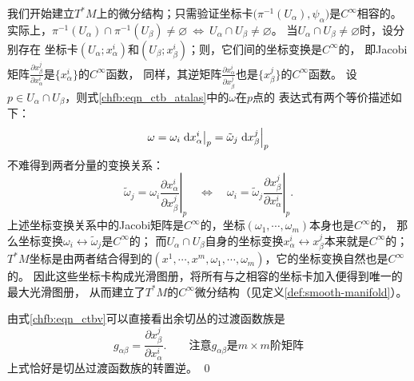 我们开始建立$T^*M$上的微分结构；只需验证坐标卡$\bigl(\pi^{-1} (U_\alpha),\psi_\alpha\bigr)$是$C^\infty$相容的。
实际上，$\pi^{-1} (U_\alpha) \cap \pi^{-1} (U_\beta) \neq \varnothing \ \Leftrightarrow\
U_\alpha \cap U_\beta \neq \varnothing$。
当$U_\alpha \cap U_\beta \neq \varnothing$时，设分别存在
坐标卡$(U_\alpha;x^i_\alpha)$和$(U_\beta;x^i_\beta)$；则，它们间的坐标变换是$C^\infty$的，
即Jacobi矩阵$\frac{\partial {x}^j_\beta}{\partial {x}^i_\alpha}$是$\{x^i_\alpha\}$的$C^\infty$函数，
同样，其逆矩阵$\frac{\partial {x}^i_\alpha}{\partial {x}^j_\beta}$也是$\{{x}^j_\beta\}$的$C^\infty$函数。
设$p \in U_\alpha \cap U_\beta$，则式\eqref{chfb:eqn_ctb_atalas}中的$\omega$在$p$点的
表达式有两个等价描述如下：
\begin{equation*}
    \omega = \omega_i \left. \dd x^i_\alpha \right | _p
    = \tilde{\omega}_j \left. \dd x^j_\beta \right | _p
\end{equation*}
不难得到两者分量的变换关系：
\begin{equation}\label{chfb:eqn_ctbv}
    \tilde{\omega}_j = \omega_i \left. \frac{\partial {x}^i_\alpha}{\partial {x}^j_\beta}  \right | _p
    {\quad \Leftrightarrow \quad}
    \omega_i  = \tilde{\omega}_j \left. \frac{\partial {x}^j_\beta}{\partial {x}^i_\alpha}  \right | _p .
\end{equation}
上述坐标变换关系中的Jacobi矩阵是$C^\infty$的，坐标$(\omega_1,\cdots,\omega_m)$本身也是$C^\infty$的，
那么坐标变换$\omega_i \leftrightarrow \tilde{\omega}_j$是$C^\infty$的；
而$U_\alpha \cap U_\beta$自身的坐标变换$x^i_\alpha \leftrightarrow {x}^j_\beta$本来就是$C^\infty$的；
$T^*M$坐标是由两者结合得到的$(x^1,\cdots,x^m,\omega_1,\cdots,\omega_m)$，它的坐标变换自然也是$C^\infty$的。
因此这些坐标卡构成光滑图册，将所有与之相容的坐标卡加入便得到唯一的最大光滑图册，
从而建立了$T^*M$的$C^\infty$微分结构（见定义\ref{def:smooth-manifold}）。

由式\eqref{chfb:eqn_ctbv}可以直接看出余切丛的过渡函数族是
\begin{equation}
    g_{\alpha\beta} = \frac{\partial {x}^j_\beta}{\partial {x}^i_\alpha}  .
    \qquad \text{注意}g_{\alpha\beta}\text{是} m\times m \text{阶矩阵}
\end{equation}
上式恰好是切丛过渡函数族的转置逆。
\qed

